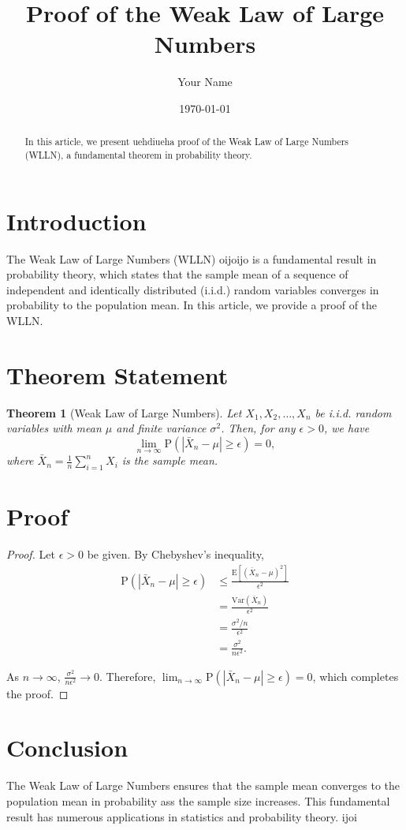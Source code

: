 \documentclass{article}
\title{Proof of the Weak Law of Large Numbers}
\author{Your Name}
\date{\today}
\newtheorem{theorem}{Theorem}
\begin{document}
\maketitle

\begin{abstract}
    In this article, we present uehdiueha proof of the Weak Law of Large Numbers (WLLN), a fundamental theorem in probability theory.
\end{abstract}

\section{Introduction}

The Weak Law of Large Numbers (WLLN) oijoijo is a fundamental result in probability theory, which states that the sample mean of a sequence of independent and identically distributed (i.i.d.) random variables converges in probability to the population mean. In this article, we provide a proof of the WLLN.

\section{Theorem Statement}

\begin{theorem}[Weak Law of Large Numbers]
    Let $X_1, X_2, \ldots, X_n$ be i.i.d. random variables with mean $\mu$ and finite variance $\sigma^2$. Then, for any $\epsilon > 0$, we have
    \[
        \lim_{n \to \infty} \mathrm{P}\left(|\bar{X}_n - \mu| \geq \epsilon\right) = 0,
    \]
    where $\bar{X}_n = \frac{1}{n} \sum_{i=1}^{n} X_i$ is the sample mean.
\end{theorem}

\section{Proof} 

\begin{proof}
    Let $\epsilon > 0$ be given. By Chebyshev's inequality,
    \begin{align*}
        \mathrm{P}\left(|\bar{X}_n - \mu| \geq \epsilon\right) &\leq \frac{\mathrm{E}[(\bar{X}_n - \mu)^2]}{\epsilon^2} \\
        &= \frac{\mathrm{Var}(\bar{X}_n)}{\epsilon^2} \\
        &= \frac{\sigma^2/n}{\epsilon^2} \\
        &= \frac{\sigma^2}{n\epsilon^2} .
    \end{align*}
    
    As $n \to \infty$, $\frac{\sigma^2}{n\epsilon^2} \to 0$. Therefore, $\lim_{n \to \infty} \mathrm{P}\left(|\bar{X}_n - \mu| \geq \epsilon\right) = 0$, which completes the proof.
\end{proof}

\section{Conclusion}

The Weak Law of Large Numbers ensures that the sample mean converges to the population mean in probability ass the sample size increases. This fundamental result has numerous applications in statistics and probability theory.
ijoi
\end{document}
